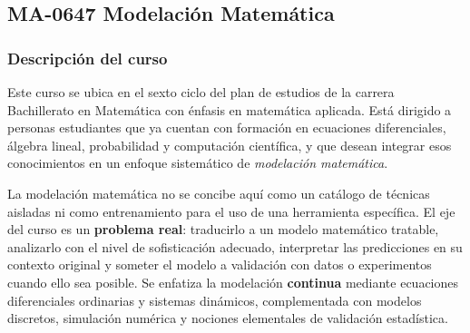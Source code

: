 \newpage
\subsection*{MA-0647 Modelación Matemática}

\hypertarget{MA0647}{}
\begin{refsection}
\begin{table}[H]
\end{table}

\subsubsection*{Descripción del curso}

Este curso se ubica en el sexto ciclo del plan de estudios de la carrera Bachillerato en Matemática con énfasis en matemática aplicada. Está dirigido a personas estudiantes que ya cuentan con formación en ecuaciones diferenciales, álgebra lineal, probabilidad y computación científica, y que desean integrar esos conocimientos en un enfoque sistemático de \emph{modelación matemática}.

La modelación matemática no se concibe aquí como un catálogo de técnicas aisladas ni como entrenamiento para el uso de una herramienta específica. El eje del curso es un \textbf{problema real}: traducirlo a un modelo matemático tratable, analizarlo con el nivel de sofisticación adecuado, interpretar las predicciones en su contexto original y someter el modelo a validación con datos o experimentos cuando ello sea posible. Se enfatiza la modelación \textbf{continua} mediante ecuaciones diferenciales ordinarias y sistemas dinámicos, complementada con modelos discretos, simulación numérica y nociones elementales de validación estadística.


\end{refsection}
